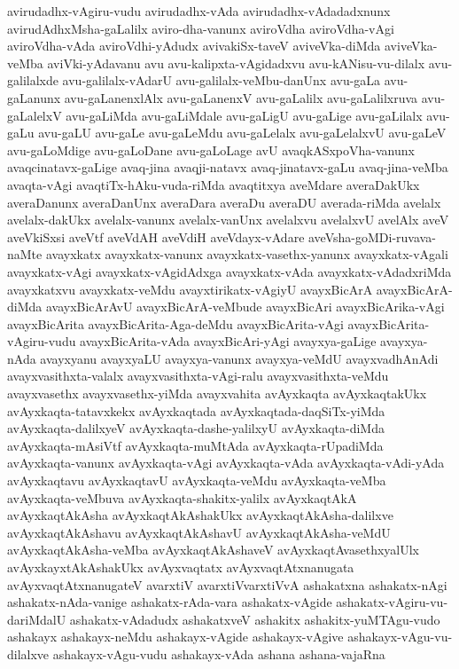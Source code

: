 {avirudadhx-vAgiru-vudu
avirudadhx-vAda
avirudadhx-vAdadadxnunx
avirudAdhxMsha-gaLalilx
aviro-dha-vanunx
aviroVdha
aviroVdha-vAgi
aviroVdha-vAda
aviroVdhi-yAdudx
avivakiSx-taveV
aviveVka-diMda
aviveVka-veMba
aviVki-yAdavanu
avu
avu-kalipxta-vAgidadxvu
avu-kANisu-vu-dilalx
avu-galilalxde
avu-galilalx-vAdarU
avu-galilalx-veMbu-danUnx
avu-gaLa
avu-gaLanunx
avu-gaLanenxlAlx
avu-gaLanenxV
avu-gaLalilx
avu-gaLalilxruva
avu-gaLalelxV
avu-gaLiMda
avu-gaLiMdale
avu-gaLigU
avu-gaLige
avu-gaLilalx
avu-gaLu
avu-gaLU
avu-gaLe
avu-gaLeMdu
avu-gaLelalx
avu-gaLelalxvU
avu-gaLeV
avu-gaLoMdige
avu-gaLoDane
avu-gaLoLage
avU
avaqkASxpoVha-vanunx
avaqcinatavx-gaLige
avaq-jina
avaqji-natavx
avaq-jinatavx-gaLu
avaq-jina-veMba
avaqta-vAgi
avaqtiTx-hAku-vuda-riMda
avaqtitxya
aveMdare
averaDakUkx
averaDanunx
averaDanUnx
averaDara
averaDu
averaDU
averada-riMda
avelalx
avelalx-dakUkx
avelalx-vanunx
avelalx-vanUnx
avelalxvu
avelalxvU
avelAlx
aveV
aveVkiSxsi
aveVtf
aveVdAH
aveVdiH
aveVdayx-vAdare
aveVsha-goMDi-ruvava-naMte
avayxkatx
avayxkatx-vanunx
avayxkatx-vasethx-yanunx
avayxkatx-vAgali
avayxkatx-vAgi
avayxkatx-vAgidAdxga
avayxkatx-vAda
avayxkatx-vAdadxriMda
avayxkatxvu
avayxkatx-veMdu
avayxtirikatx-vAgiyU
avayxBicArA
avayxBicArA-diMda
avayxBicArAvU
avayxBicArA-veMbude
avayxBicAri
avayxBicArika-vAgi
avayxBicArita
avayxBicArita-Aga-deMdu
avayxBicArita-vAgi
avayxBicArita-vAgiru-vudu
avayxBicArita-vAda
avayxBicAri-yAgi
avayxya-gaLige
avayxya-nAda
avayxyanu
avayxyaLU
avayxya-vanunx
avayxya-veMdU
avayxvadhAnAdi
avayxvasithxta-valalx
avayxvasithxta-vAgi-ralu
avayxvasithxta-veMdu
avayxvasethx
avayxvasethx-yiMda
avayxvahita
avAyxkaqta
avAyxkaqtakUkx
avAyxkaqta-tatavxkekx
avAyxkaqtada
avAyxkaqtada-daqSiTx-yiMda
avAyxkaqta-dalilxyeV
avAyxkaqta-dashe-yalilxyU
avAyxkaqta-diMda
avAyxkaqta-mAsiVtf
avAyxkaqta-muMtAda
avAyxkaqta-rUpadiMda
avAyxkaqta-vanunx
avAyxkaqta-vAgi
avAyxkaqta-vAda
avAyxkaqta-vAdi-yAda
avAyxkaqtavu
avAyxkaqtavU
avAyxkaqta-veMdu
avAyxkaqta-veMba
avAyxkaqta-veMbuva
avAyxkaqta-shakitx-yalilx
avAyxkaqtAkA
avAyxkaqtAkAsha
avAyxkaqtAkAshakUkx
avAyxkaqtAkAsha-dalilxve
avAyxkaqtAkAshavu
avAyxkaqtAkAshavU
avAyxkaqtAkAsha-veMdU
avAyxkaqtAkAsha-veMba
avAyxkaqtAkAshaveV
avAyxkaqtAvasethxyalUlx
avAyxkayxtAkAshakUkx
avAyxvaqtatx
avAyxvaqtAtxnanugata
avAyxvaqtAtxnanugateV
avarxtiV
avarxtiVvarxtiVvA
ashakatxna
ashakatx-nAgi
ashakatx-nAda-vanige
ashakatx-rAda-vara
ashakatx-vAgide
ashakatx-vAgiru-vu-dariMdalU
ashakatx-vAdadudx
ashakatxveV
ashakitx
ashakitx-yuMTAgu-vudo
ashakayx
ashakayx-neMdu
ashakayx-vAgide
ashakayx-vAgive
ashakayx-vAgu-vu-dilalxve
ashakayx-vAgu-vudu
ashakayx-vAda
ashana
ashana-vajaRna
}
